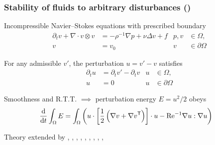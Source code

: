 \documentclass[mathserif]{beamer}
\begin{document}
\begin{frame}
\frametitle{Stability of fluids to arbitrary disturbances (\citet{Serrin1959Stability})}
\vfill
\small

\begin{block}{Incompressible Navier--Stokes equations with prescribed boundary}
\vspace{-1em}
\begin{align}
    \partial_t v + \nabla\cdot{}v\otimes{}v
&=
  - \rho^{-1} \nabla{} p
  + \nu \Delta{}v
  + f
&
  p, v &\in \Omega
  ,
\\
  v &= v_0
&
  v &\in \partial\Omega
\end{align}
\end{block}

\begin{block}{For any admissible $v'$, the perturbation $u = v' - v$ satisfies}
\vspace{-1em}
\begin{align}
  \partial_t u
&=
  \partial_t v'
  -
  \partial_t v
&
  u &\in \Omega
  ,
\\
  u &= 0
&
  u &\in \partial\Omega
\end{align}
\end{block}

\begin{block}{Smoothness and R.T.T. $\implies$ perturbation energy $E=u^2/2$ obeys}
\vspace{-1em}
\begin{align}
  \frac{\mathrm{d}}{\mathrm{d}t} \int_\Omega E
&=
  \int_\Omega \left(
      u \cdot \left[\frac{1}{2}\left(\nabla v + {\nabla v}^{\mathsf{T}}\right)\right] \cdot u
      - \mbox{Re}_{}^{-1} \nabla u : \nabla u
  \right)
\end{align}
\end{block}

{%
    \footnotesize{}
    Theory extended by
    \citet{Joseph1965Stability, Joseph1966Nonlinear},
    \citet{Dudis1971Ekman, Dudis1971Buoyancy},
    \citet{Davis1973Reformulation},
    \citet{Galdi1983Local},
    \citet{Maremonti1984Asymptotic},
    \citet{Galdi1985Nonlinear},
    \citet{Galdi1990New},
    \citet{Padula1997Existence},
    \citet{Padula2000Stability},
    \citet{Padula2011Asymptotic}
}

\end{frame}
\end{document}

